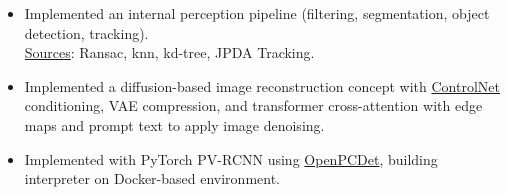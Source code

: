 \begin{itemize}[leftmargin=*]
  \item Implemented an internal perception pipeline (filtering, segmentation, object detection, tracking).\\ {\fontsize{10pt}{10pt}\selectfont\textcolor{blocktext2_color}{{\fontsize{10pt}{10pt}\selectfont\textcolor{blocktext2_color}{\href{https://amr-aboughazala.super.site/projects/perception}{Sources}}}: Ransac, knn, kd-tree, JPDA Tracking}}.
  
  \vspace{0.2em}
  
  \item Implemented a diffusion-based image reconstruction concept with {\fontsize{10pt}{10pt}\selectfont\textcolor{blocktext2_color}{{\fontsize{10pt}{10pt}\selectfont\textcolor{blocktext2_color}{\href{https://github.com/lllyasviel/ControlNet}{ControlNet}}}}} conditioning, VAE compression, and transformer cross-attention with edge maps and prompt text to apply image denoising.

  
  \vspace{0.2em}
  
  \item Implemented with PyTorch PV-RCNN using {\fontsize{10pt}{10pt}\selectfont\textcolor{blocktext2_color}{{\fontsize{10pt}{10pt}\selectfont\textcolor{blocktext2_color}{\href{https://github.com/open-mmlab/OpenPCDet}{OpenPCDet}}}}}, building interpreter on Docker-based environment.   

\end{itemize}